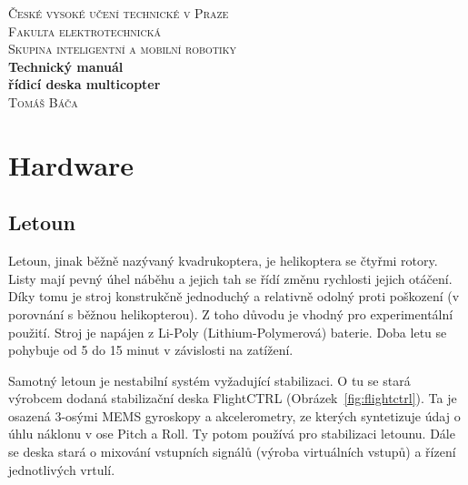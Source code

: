 \documentclass[11pt, a4paper]{article}
\newcommand{\Author}{Tomáš Báča}
\begin{document}
\begin{titlepage}

\begin{center}

\textsc{\LARGE České vysoké učení technické v Praze }\\[1.0cm]
\textsc{\LARGE Fakulta elektrotechnická }\\[1.0cm]
\textsc{\large Skupina inteligentní a mobilní robotiky }\\[0.5cm]

{ \huge \bfseries Technický manuál\\[0.5cm] řídicí deska multicopter }\\[1.0cm]

\large
\textsc{\Author}

\vfill

\end{center}

\end{titlepage}

\newpage

\tableofcontents

\newpage

\setlength{\parskip}{0.35cm}
\lhead{\emph{\leftmark}}
\rhead{}
\cfoot{}
\rfoot{\thepage$/$\pageref{LastPage}}

\section{Hardware}

\subsection{Letoun}

Letoun, jinak běžně nazývaný kvadrukoptera, je helikoptera se čtyřmi rotory. Listy mají pevný úhel náběhu a jejich tah se řídí změnu rychlosti jejich otáčení. Díky tomu je stroj konstrukčně jednoduchý a relativně odolný proti poškození (v porovnání s běžnou helikopterou). Z toho důvodu je vhodný pro experimentální použití. Stroj je napájen z Li-Poly (Lithium-Polymerová) baterie. Doba letu se pohybuje od 5 do 15 minut v závislosti na zatížení.

Samotný letoun je nestabilní systém vyžadující stabilizaci. O tu se stará výrobcem dodaná stabilizační deska FlightCTRL (Obrázek~\ref{fig:flightctrl}). Ta je osazená 3-osými MEMS gyroskopy a akcelerometry, ze kterých syntetizuje údaj o úhlu náklonu v ose Pitch a Roll. Ty potom používá pro stabilizaci letounu. Dále se deska stará o mixování vstupních signálů (výroba virtuálních vstupů) a řízení jednotlivých vrtulí.
\end{document}
